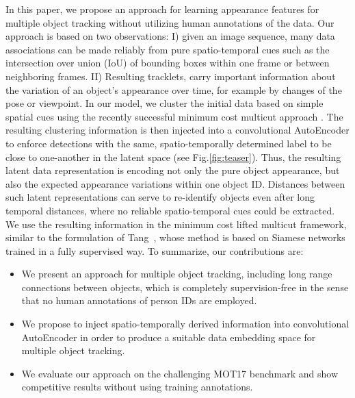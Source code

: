In this paper, we propose an approach for learning appearance features for multiple object tracking without utilizing human annotations of the data. 
Our approach is based on two observations:  I) given an image sequence, many data associations can be made reliably from pure spatio-temporal cues such as the intersection over union (IoU) of bounding boxes within one frame or between neighboring frames. 
II) Resulting tracklets, carry important information about the variation of an object's appearance over time, for example by changes of the pose or viewpoint. 
In our model, we cluster the initial data based on simple spatial cues using the recently successful minimum cost multicut approach \cite{tang2016multi}. 
The resulting clustering information is then injected into a convolutional AutoEncoder to enforce detections with the same, spatio-temporally determined label to be close to one-another in the latent space (see Fig.\ref{fig:teaser}). 
Thus, the resulting latent data representation is encoding not only the pure object appearance, but also the expected appearance variations within one object ID. 
Distances between such latent representations can serve to re-identify objects even after long temporal distances, where no reliable spatio-temporal cues could be extracted. 
We use the resulting information in the minimum cost lifted multicut framework, similar to the formulation of Tang~\cite{tang2017multiple}, whose method is based on Siamese networks trained in a fully supervised way. To summarize, our contributions are:
\begin{itemize}
    \item We present an approach for multiple object tracking, including long range connections between objects, which is completely supervision-free in the sense that no human annotations of person IDs are employed.
	\item We propose to inject spatio-temporally derived information into convolutional AutoEncoder in order to produce a suitable data embedding space for multiple object tracking.
	\item  We evaluate our approach on the challenging MOT17 benchmark and show competitive results without using training annotations. 
\end{itemize}
